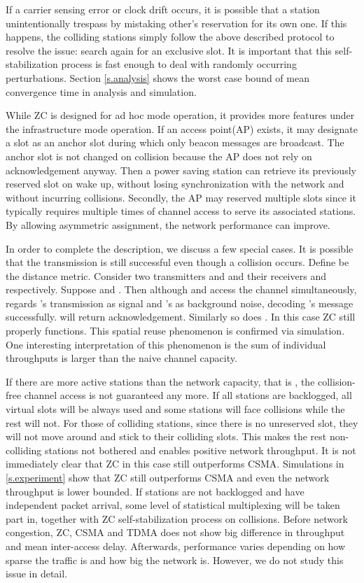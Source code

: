 \documentclass{acm_proc_article-sp}
\begin{document}
If a carrier sensing error or clock drift occurs, it is possible that a station unintentionally trespass by mistaking other's reservation for its own one. If this happens, the colliding stations simply follow the above described protocol to resolve the issue: search again for an exclusive slot. It is important that this self-stabilization process is fast enough to deal with randomly occurring perturbations. Section \ref{s.analysis} shows the worst case bound of mean convergence time in analysis and simulation.

While ZC is designed for ad hoc mode operation, it provides more features under the infrastructure mode operation. If an access point(AP) exists, it may designate a slot as an anchor slot during which only beacon messages are broadcast. The anchor slot is not changed on collision because the AP does not rely on acknowledgement anyway. Then a power saving station can retrieve its previously reserved slot on wake up, without losing synchronization with the network and without incurring collisions. Secondly, the AP may reserved multiple slots since it typically requires multiple times of channel access to serve its associated stations. By allowing asymmetric assignment, the network performance can improve.


In order to complete the description, we discuss a few special cases.
It is possible that the transmission is still successful even though a collision occurs. Define  be the distance metric. Consider two transmitters  and  and their receivers  and  respectively. Suppose  and . Then although  and  access the channel simultaneously,  regards 's transmission as signal and 's as background noise, decoding 's message successfully.  will return acknowledgement. Similarly so does . In this case ZC still properly functions. This spatial reuse phenomenon is confirmed via simulation. One interesting interpretation of this phenomenon is the sum of individual throughputs is larger than the naive channel capacity.

If there are more active stations than the network capacity, that is , the collision-free channel access is not guaranteed any more. If all stations are backlogged, all virtual slots will be always used and some stations will face collisions while the rest will not. For those of colliding stations, since there is no unreserved slot, they will not move around and stick to their colliding slots. This makes the rest non-colliding stations not bothered and enables positive network throughput. It is not immediately clear that ZC in this case still outperforms CSMA. Simulations in \ref{s.experiment} show that ZC still outperforms CSMA and even the network throughput is lower bounded.
If stations are not backlogged and have independent packet arrival, some level of statistical multiplexing will be taken part in, together with ZC self-stabilization process on collisions.
Before network congestion, ZC, CSMA and TDMA does not show big difference in throughput and mean inter-access delay. Afterwards, performance varies depending on how sparse the traffic is and how big the network is. However, we do not study this issue in detail.
\end{document}
